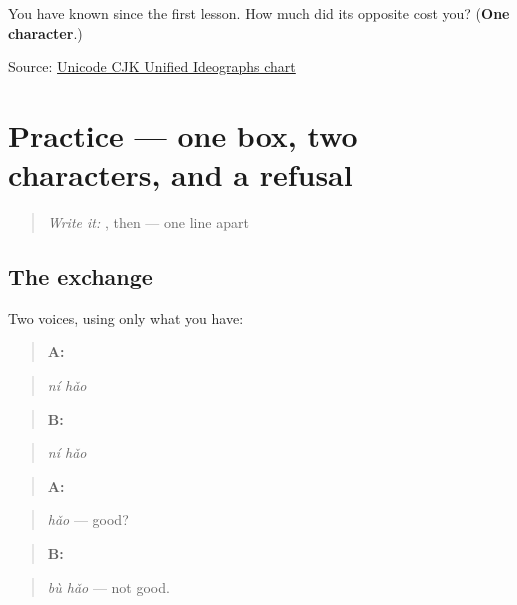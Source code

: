 \begin{tcolorbox}[breakable,colback=teal!4,colframe=teal!35!black,title={Before you move on}]
You have known  since the first lesson. How much did its opposite cost you? (\textbf{One character}.)

Source: \href{https://www.unicode.org/charts/PDF/U4E00.pdf}{Unicode CJK Unified Ideographs chart}
\end{tcolorbox}
\section[Practice]{Practice — one box, two characters, and a refusal}

\label{lesson:ZH-C04-practice}



\begin{quote}
\emph{Write it:} , then  — one line apart
\end{quote}

\subsection*{The exchange}
Two voices, using only what you have:

\begin{quote}
\textbf{A:} 
\end{quote}

\begin{quote}
\emph{ní hǎo}
\end{quote}

\begin{quote}
\textbf{B:} 
\end{quote}

\begin{quote}
\emph{ní hǎo}
\end{quote}

\begin{quote}
\textbf{A:} 
\end{quote}

\begin{quote}
\emph{hǎo} — good?
\end{quote}

\begin{quote}
\textbf{B:} 
\end{quote}

\begin{quote}
\emph{bù hǎo} — not good.
\end{quote}

